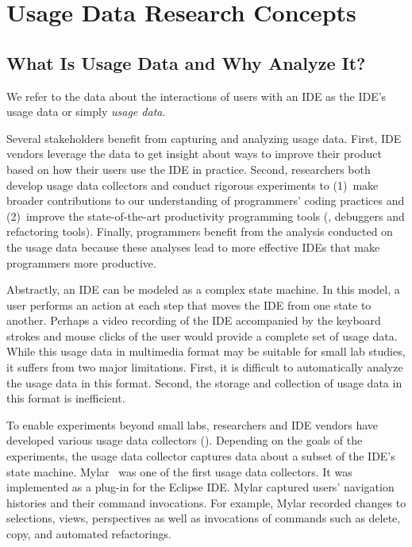 \section{Usage Data Research Concepts}

\subsection{What Is Usage Data and Why Analyze It?}

We refer to the data about the interactions of users with an IDE as the IDE's
usage data or simply \emph{usage data}.

%
Several stakeholders benefit from capturing and analyzing usage data. First, IDE
vendors leverage the data to get insight about ways to improve their product
based on how their users use the IDE in practice. Second, researchers both
develop usage data collectors and conduct rigorous experiments to (1)~make
broader contributions to our understanding of programmers' coding practices and
(2)~improve the state-of-the-art productivity programming tools (\eg, debuggers
and refactoring tools). Finally, programmers benefit from the analysis conducted
on the usage data because these analyses lead to more effective IDEs that make
programmers more productive.

Abstractly, an IDE can be modeled as a complex state machine. In this model, a
user performs an action at each step that moves the IDE from one state to
another.
%
Perhaps a video recording of the IDE accompanied by the keyboard strokes and
mouse clicks of the user would provide a complete set of usage data.
%
While this usage data in multimedia format may be suitable for small lab
studies, it suffers from two major limitations. First, it is difficult to
automatically analyze the usage data in this format. Second, the storage and
collection of usage data in this format is inefficient.

To enable experiments beyond small labs, researchers and IDE vendors have
developed various usage data collectors ().
Depending on the goals of the experiments, the usage data collector captures
data about a subset of the IDE's state machine.
%
Mylar~\cite{V:Murphy2006How} was one of the first usage data collectors. It was
implemented as a plug-in for the Eclipse IDE. Mylar captured users' navigation
histories and their command invocations. For example, Mylar recorded changes to
selections, views, perspectives as well as invocations of commands such as
delete, copy, and automated refactorings.

